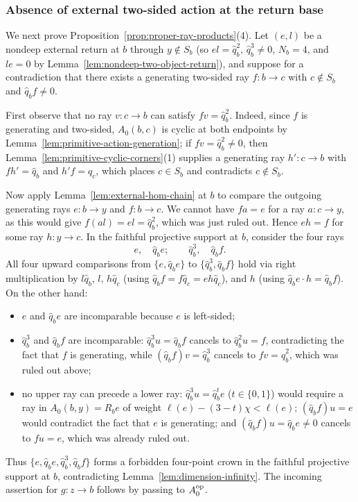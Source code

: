 \subsubsection{Absence of external two-sided action at the return base}
\label{app:external-two-sided-action}

We next prove Proposition~\ref{prop:proper-ray-products}(4). Let $(e,l)$ be a nondeep external return at $b$ through $y\notin S_b$ (so $el=\widehat q_b^2$, $\widehat q_b^3\ne0$, $N_b=4$, and $le=0$ by Lemma~\ref{lem:nondeep-two-object-return}), and suppose for a contradiction that there exists a generating two-sided ray $f\colon b\to c$ with $c\notin S_b$ and $\widehat q_bf\ne0$.

First observe that no ray $v\colon c\to b$ can satisfy $fv=\widehat q_b^2$. Indeed, since $f$ is generating and two-sided, $A_0(b,c)$ is cyclic at both endpoints by Lemma~\ref{lem:primitive-action-generation}; if $fv=\widehat q_b^2\ne0$, then Lemma~\ref{lem:primitive-cyclic-corners}(1) supplies a generating ray $h'\colon c\to b$ with $fh'=\widehat q_b$ and $h'f=q_c$, which places $c\in S_b$ and contradicts $c\notin S_b$.

Now apply Lemma~\ref{lem:external-hom-chain} at $b$ to compare the outgoing generating rays $e\colon b\to y$ and $f\colon b\to c$. We cannot have $fa=e$ for a ray $a\colon c\to y$, as this would give $f(al)=el=\widehat q_b^2$, which was just ruled out. Hence $eh=f$ for some ray $h\colon y\to c$. In the faithful projective support at $b$, consider the four rays
\[
  e,\quad \widehat q_be;\qquad \widehat q_b^3,\quad \widehat q_bf.
\]
All four upward comparisons from $\{e,\widehat q_be\}$ to $\{\widehat q_b^3,\widehat q_bf\}$ hold via right multiplication by $l\widehat q_b$, $l$, $h\widehat q_c$ (using $\widehat q_bf=f\widehat q_c=eh\widehat q_c$), and $h$ (using $\widehat q_be\cdot h=\widehat q_bf$). On the other hand:
\begin{itemize}
\item $e$ and $\widehat q_be$ are incomparable because $e$ is left-sided;
\item $\widehat q_b^3$ and $\widehat q_bf$ are incomparable: $\widehat q_b^3u=\widehat q_bf$ cancels to $\widehat q_b^2u=f$, contradicting the fact that $f$ is generating, while $(\widehat q_bf)v=\widehat q_b^3$ cancels to $fv=\widehat q_b^2$, which was ruled out above;
\item no upper ray can precede a lower ray: $\widehat q_b^3u=\widehat q_b^te$ ($t\in\{0,1\}$) would require a ray in $A_0(b,y)=R_be$ of weight $\ell(e)-(3-t)\chi<\ell(e)$; $(\widehat q_bf)u=e$ would contradict the fact that $e$ is generating; and $(\widehat q_bf)u=\widehat q_be\ne0$ cancels to $fu=e$, which was already ruled out.
\end{itemize}
Thus $\{e,\widehat q_be,\widehat q_b^3,\widehat q_bf\}$ forms a forbidden four-point crown in the faithful projective support at $b$, contradicting Lemma~\ref{lem:dimension-infinity}. The incoming assertion for $g\colon z\to b$ follows by passing to $A_0^{\mathrm{op}}$.

